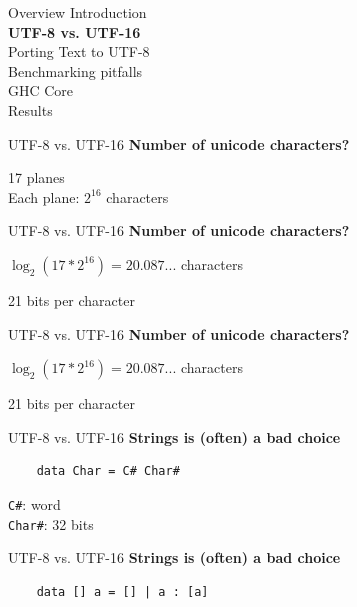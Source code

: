 \documentclass[20pt]{beamer}
\newcommand{\vspaced}{
    \vspace{5mm}
}
\begin{document}

\begin{frame}{Overview}
    Introduction \\
    \textbf{UTF-8 vs. UTF-16} \\
    Porting Text to UTF-8 \\
    Benchmarking pitfalls \\
    GHC Core \\
    Results
\end{frame}

\begin{frame}{UTF-8 vs. UTF-16}
    \textbf{Number of unicode characters?} \\
    \vspaced
    17 planes \\
    Each plane: $2^{16}$ characters \\
\end{frame}

\begin{frame}{UTF-8 vs. UTF-16}
    \textbf{Number of unicode characters?} \\
    \vspaced
    $\log_2(17 * 2^{16}) = 20.087...$ characters \\
    \vspaced
    21 bits per character \\
\end{frame}

\begin{frame}{UTF-8 vs. UTF-16}
    \textbf{Number of unicode characters?} \\
    \vspaced
    $\log_2(17 * 2^{16}) = 20.087...$ characters \\
    \vspaced
    21 bits per character \\
\end{frame}

\begin{frame}[fragile]{UTF-8 vs. UTF-16}
    \textbf{Strings is (often) a bad choice} \\
    \vspaced
    \begin{lstlisting}
    data Char = C# Char#
    \end{lstlisting}
    \texttt{C\#}: word \\
    \texttt{Char\#}: 32 bits \\
\end{frame}

\begin{frame}[fragile]{UTF-8 vs. UTF-16}
    \textbf{Strings is (often) a bad choice} \\
    \vspaced
    \begin{lstlisting}
    data [] a = [] | a : [a]
    \end{lstlisting}
\end{frame}
\end{document}
